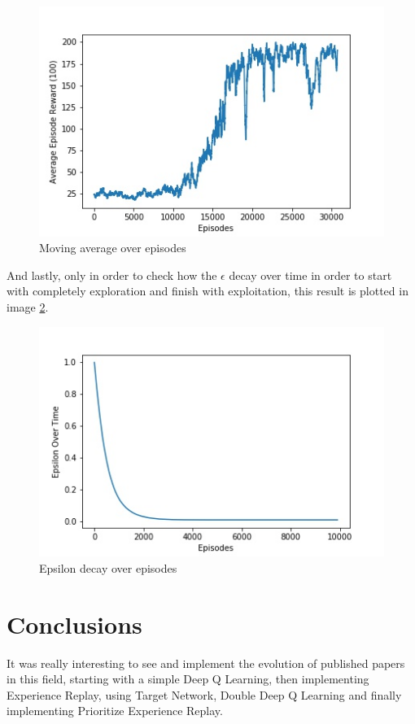 \documentclass{article}
\begin{document}
\begin{figure}[!ht]
\centering
\includegraphics[scale=0.6]{movingAverage}
\caption{Moving average over episodes}
\label{fig:fig3}
\end{figure}

And lastly, only in order to check how the $\epsilon$ decay over time in order to start with completely exploration and finish with exploitation, this result is plotted in image \ref{fig:fig4}.

\begin{figure}[!ht]
\centering
\includegraphics[scale=0.6]{Epsilon}
\caption{Epsilon decay over episodes}
\label{fig:fig4}
\end{figure}

\section{Conclusions}
It was really interesting to see and implement the evolution of published papers in this field, starting with a simple Deep Q Learning, then implementing Experience Replay, using Target Network, Double Deep Q Learning and finally implementing Prioritize Experience Replay.
\end{document}
